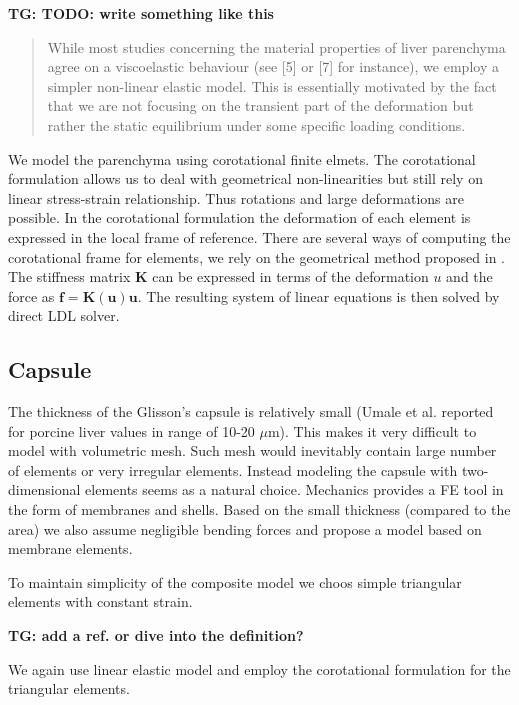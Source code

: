 \documentclass{llncs}
\newcommand{\TG}[1]{{\color{blue}\textbf{TG: #1}}}
\newcommand{\Vec}[1]{\mathbf{#1}}
\newcommand{\Mat}[1]{\mathbf{#1}}
\begin{document}
\TG{TODO: write something like this} %
\begin{quote}
While most studies concerning the material properties of liver parenchyma
agree on a viscoelastic behaviour (see [5] or [7] for instance), we employ
a simpler non-linear elastic model. This is essentially motivated by the
fact that we are not focusing on the transient part of the deformation but
rather the static equilibrium under some specific loading conditions.
\end{quote}


We model the parenchyma using corotational finite elmets. The corotational
formulation allows us to deal with geometrical non-linearities but still
rely on linear stress-strain relationship. Thus rotations and large
deformations are possible. In the corotational formulation the deformation
of each element is expressed in the local frame of reference. There are
several ways of computing the corotational frame for elements, we rely on
the geometrical method proposed in \cite{Nesme2005}.
The stiffness matrix $\Mat{K}$ can be expressed in terms of the deformation
$u$ and the force as $\Vec{f} = \Mat{K}(\Vec{u}) \Vec{u}$. The resulting
system of linear equations is then solved by direct LDL solver.


\subsection{Capsule} %

The thickness of the Glisson's capsule is relatively small (Umale et al.
\cite{Umale2011} reported for porcine liver values in range of 10-20
$\mu$m). This makes it very difficult to model with volumetric mesh. Such
mesh would inevitably contain large number of elements or very irregular
elements. Instead modeling the capsule with two-dimensional elements seems
as a natural choice. Mechanics provides a FE tool in the form of membranes
and shells. Based on the small thickness (compared to the area) we also
assume negligible bending forces and propose a model based on membrane
elements. 

To maintain simplicity of the composite model we choos simple triangular
elements with constant strain.

\TG{add a ref. or dive into the definition?}

We again use linear elastic model and employ the  corotational formulation
for the triangular elements.
\end{document}

